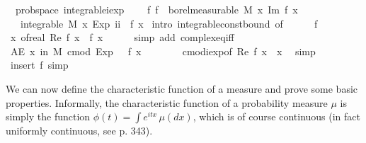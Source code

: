 \documentclass[leqno]{article}
\theoremstyle{definition}
\begin{document}
\begin{isabellebody}
\isamarkupfalse%
\ {\isacharparenleft}\ prob{\isacharunderscore}space{\isacharparenright}\ integrable{\isacharunderscore}iexp{\isacharcolon}\ \isanewline
\ \ \ f{\isacharcolon}\ {\isachardoublequoteopen}f\ {\isasymin}\ borel{\isacharunderscore}measurable\ M{\isachardoublequoteclose}\ {\isachardoublequoteopen}{\isasymAnd}x{\isachardot}\ Im\ {\isacharparenleft}f\ x{\isacharparenright}\ {\isacharequal}\ {}{\isachardoublequoteclose}\isanewline
\ \ \ {\isachardoublequoteopen}integrable\ M\ {\isacharparenleft}{\isasymlambda}x{\isachardot}\ Exp\ {\isacharparenleft}ii\ {\isacharasterisk}\ {\isacharparenleft}f\ x{\isacharparenright}{\isacharparenright}{\isacharparenright}{\isachardoublequoteclose}\isanewline
{}\isamarkupfalse%
\ {\isacharparenleft}intro\ integrable{\isacharunderscore}const{\isacharunderscore}bound\ {\isacharbrackleft}of\ {\isacharunderscore}\ {}{\isacharbrackright}{\isacharparenright}\isanewline
\ \ \isamarkupfalse%
\ f\ \isamarkupfalse%
\ {\isachardoublequoteopen}{\isasymAnd}x{\isachardot}\ of{\isacharunderscore}real\ {\isacharparenleft}Re\ {\isacharparenleft}f\ x{\isacharparenright}{\isacharparenright}\ {\isacharequal}\ f\ x{\isachardoublequoteclose}\isanewline
\ \ \ \ \isamarkupfalse%
\ {\isacharparenleft}simp\ add{\isacharcolon}\ complex{\isacharunderscore}eq{\isacharunderscore}iff{\isacharparenright}\isanewline
\ \ \isamarkupfalse%
\ \isamarkupfalse%
\ {\isachardoublequoteopen}AE\ x\ in\ M{\isachardot}\ cmod\ {\isacharparenleft}Exp\ {\isacharparenleft}{\isasymi}\ {\isacharasterisk}\ f\ x{\isacharparenright}{\isacharparenright}\ {\isasymle}\ {}{\isachardoublequoteclose}\isanewline
\ \ \ \ \isamarkupfalse%
\ cmod{\isacharunderscore}iexp{\isacharbrackleft}of\ {\isachardoublequoteopen}Re\ {\isacharparenleft}f\ x{\isacharparenright}{\isachardoublequoteclose}\ \ x{\isacharbrackright}\ \isamarkupfalse%
\ simp\isanewline
{}\isamarkupfalse%
\ {\isacharparenleft}insert\ f{\isacharcomma}\ simp{\isacharparenright}%
\end{isabellebody}

\medskip

We can now define the characteristic function of a measure and prove some basic properties. Informally, the characteristic function of a probability measure $\mu$ is simply the function $\phi(t) = \int e^{itx} \, \mu(dx)$, which is of course continuous (in fact uniformly continuous, see \cite{billingsley} p. 343).
\end{document}
